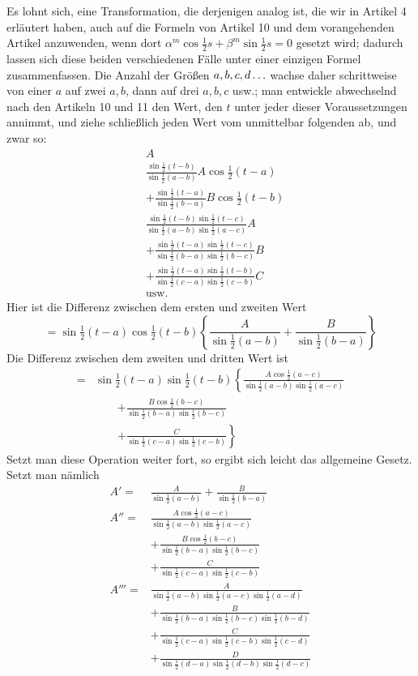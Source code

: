 \begingroup
\renewcommand{\arraystretch}{1.45}
Es lohnt sich, eine Transformation, die derjenigen analog ist, die wir in Artikel 4 erläutert haben,
auch auf die Formeln von Artikel 10 und dem vorangehenden Artikel anzuwenden, wenn dort $\alpha^m\cos\tfrac12s+\beta^m\sin\tfrac12s=0$
gesetzt wird; dadurch lassen sich diese beiden verschiedenen Fälle unter einer einzigen Formel zusammenfassen.
Die Anzahl der Größen $a,b,c,d\mathinner{.\,.\,.}$ wachse daher schrittweise
von einer $a$ auf zwei $a,b$, dann auf drei $a,b,c$ usw.; man entwickle abwechselnd
nach den Artikeln 10 und 11 den Wert, den $t$ unter jeder dieser Voraussetzungen annimmt, und ziehe schließlich
jeden Wert vom unmittelbar folgenden ab, und zwar so:
\[
\begin{aligned}
&A\\[5pt]
&\frac{\sin\tfrac12(t-b)}{\sin\tfrac12(a-b)}A\cos\tfrac12(t-a)\\[5pt]
&+\frac{\sin\tfrac12(t-a)}{\sin\tfrac12(b-a)}B\cos\tfrac12(t-b)\\[5pt]
&\frac{\sin\tfrac12(t-b)\sin\tfrac12(t-c)}{\sin\tfrac12(a-b)\sin\tfrac12(a-c)}A\\[5pt]
&+\frac{\sin\tfrac12(t-a)\sin\tfrac12(t-c)}{\sin\tfrac12(b-a)\sin\tfrac12(b-c)}B\\[5pt]
&+\frac{\sin\tfrac12(t-a)\sin\tfrac12(t-b)}{\sin\tfrac12(c-a)\sin\tfrac12(c-b)}C\\[5pt]
&\text{usw.}
\end{aligned}
\]
Hier ist die Differenz zwischen dem ersten und zweiten Wert
\[
=\sin\tfrac12(t-a)\cos\tfrac12(t-b)
\left\{\frac{A}{\sin\tfrac12(a-b)}+\frac{B}{\sin\tfrac12(b-a)}\right\}
\]
Die Differenz zwischen dem zweiten und dritten Wert ist
\[
\begin{aligned}
={}&\sin\tfrac12(t-a)\sin\tfrac12(t-b)\left\{
\frac{A\cos\tfrac12(a-c)}{\sin\tfrac12(a-b)\sin\tfrac12(a-c)}\right.\\[5pt]&\qquad\left.
+\frac{B\cos\tfrac12(b-c)}{\sin\tfrac12(b-a)\sin\tfrac12(b-c)}\right.\\[5pt]&\qquad\left.
+\frac{C}{\sin\tfrac12(c-a)\sin\tfrac12(c-b)}\right\}
\end{aligned}
\]
Setzt man diese Operation weiter fort, so ergibt sich leicht das allgemeine Gesetz. Setzt man nämlich
\[
\begin{aligned}
A'={}&\frac{A}{\sin\tfrac12(a-b)}+\frac{B}{\sin\tfrac12(b-a)}\\[5pt]
A''={}&\frac{A\cos\tfrac12(a-c)}{\sin\tfrac12(a-b)\sin\tfrac12(a-c)}\\[5pt]
&+\frac{B\cos\tfrac12(b-c)}{\sin\tfrac12(b-a)\sin\tfrac12(b-c)}\\[5pt]
&+\frac{C}{\sin\tfrac12(c-a)\sin\tfrac12(c-b)}\\[5pt]
A'''={}&\frac{A}{\sin\tfrac12(a-b)\sin\tfrac12(a-c)\sin\tfrac12(a-d)}\\[5pt]
&+\frac{B}{\sin\tfrac12(b-a)\sin\tfrac12(b-c)\sin\tfrac12(b-d)}\\[5pt]
&+\frac{C}{\sin\tfrac12(c-a)\sin\tfrac12(c-b)\sin\tfrac12(c-d)}\\[5pt]
&+\frac{D}{\sin\tfrac12(d-a)\sin\tfrac12(d-b)\sin\tfrac12(d-c)}\\[5pt]
\end{aligned}\]
